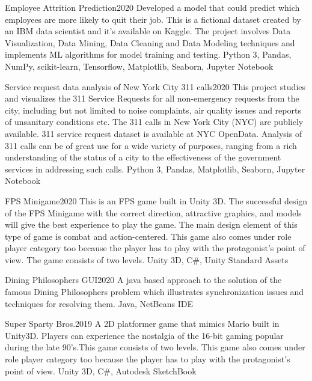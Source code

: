 %
%
%


\begin{projects}
	\project
	{Employee Attrition Prediction}{2020}
	{}
	{Developed a model that could predict which employees are more likely to quit their job. This is a fictional dataset created by an IBM data scientist and it's available on Kaggle. The project involves Data Visualization, Data Mining, Data Cleaning and Data Modeling techniques and implements ML algorithms for model training and testing.}
	{Python 3, Pandas, NumPy, scikit-learn, Tensorflow, Matplotlib, Seaborn, Jupyter Notebook}
				
	\project
	{Service request data analysis of New York City 311 calls}{2020}
	{}
	{This project studies and visualizes the 311 Service Requests for all non-emergency requests from the city, including but not limited to noise complaints, air quality issues and reports of unsanitary conditions etc. The 311 calls in New York City (NYC) are publicly available. 311 service request dataset is available at NYC OpenData. Analysis of 311 calls can be of great use for a wide variety of purposes, ranging from a rich understanding of the status of a city to the effectiveness of the government services in addressing such calls. }
	{Python 3, Pandas, Matplotlib, Seaborn, Jupyter Notebook}
	
	\project
	{FPS Minigame}{2020}
	{}
	{This is an FPS game built in Unity 3D. The successful design of the FPS Minigame with the correct direction, attractive graphics, and models will give the best experience to play the game. The main design element of this type of game is combat and action-centered. This game also comes under role player category too because the player has to play with the protagonist's point of view. The game consists of two levels.}
	{Unity 3D, C\#, Unity Standard Assets}
	
	\project
	{Dining Philosophers GUI}{2020}
	{}
	{A java based approach to the solution of the famous Dining Philosophers problem which illustrates synchronization issues and techniques for resolving them.}
	{Java, NetBeans IDE}
	
	\project
	{Super Sparty Bros.}{2019}
	{}
	{A 2D platformer game that mimics Mario built in Unity3D. Players can experience the nostalgia of the 16-bit gaming popular during the late 90's.This game consists of two levels. This game also comes under role player category too because the player has to play with the protagonist's point of view.}
	{Unity 3D, C\#, Autodesk SketchBook}
	

\end{projects}